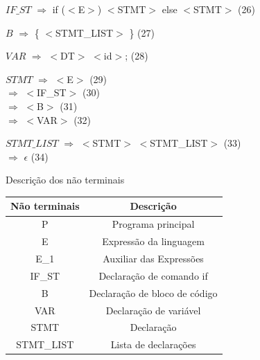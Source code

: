 \documentclass[]{article}
\numberwithin{equation}{section}
\begin{document}
\begin{flushleft}
$IF\_ST$ $\Rightarrow$ if ($<$E$>$) $<$STMT$>$ else $<$STMT$>$ (26)
\end{flushleft}

\begin{flushleft}
$B$ $\Rightarrow$ \{ $<$STMT\_LIST$>$ \} (27)
\end{flushleft}

\begin{flushleft}
$VAR$ $\Rightarrow$ $<$DT$>$ $<$id$>$; (28)
\end{flushleft}

\begin{flushleft}
$STMT$ $\Rightarrow$ $<$E$>$ (29) \\
\hspace{0.96cm} $\Rightarrow$ $<$IF\_ST$>$ (30) \\
\hspace{0.96cm} $\Rightarrow$ $<$B$>$ (31) \\
\hspace{0.96cm} $\Rightarrow$ $<$VAR$>$ (32)
\end{flushleft}

\begin{flushleft}
$STMT\_LIST$ $\Rightarrow$ $<$STMT$>$  $<$STMT\_LIST$>$ (33) \\
\hspace{1.62cm} $\Rightarrow$ $\epsilon$ (34) 
\end{flushleft}

\newpage

Descrição dos não terminais

\begin{center}
\begin{tabular}{|c|c|}
  \hline
  Não terminais & Descrição \\ \hline
  P & Programa principal \\ \hline
  E & Expressão da linguagem \\ \hline
  E\_1 & Auxiliar das Expressões \\ \hline
  IF\_ST & Declaração de comando if \\ \hline
  B & Declaração de bloco de código \\ \hline
  VAR & Declaração de variável \\ \hline
  STMT & Declaração \\ \hline
  STMT\_LIST & Lista de declarações \\ \hline
\end{tabular}
\end{center}
\end{document}
